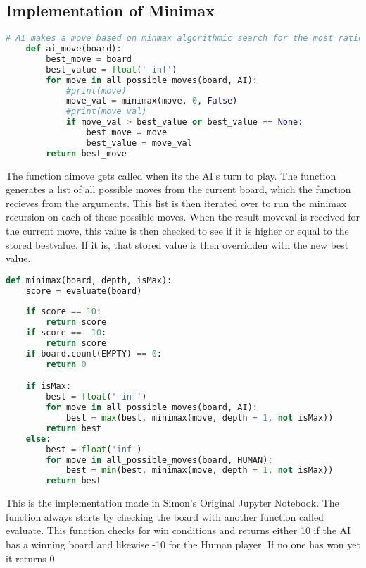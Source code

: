 \subsection{Implementation of Minimax}
\label{subsec:Implementation of Minimax}
\begin{lstlisting}[language=python, caption={python example}, label={Script}, basicstyle=\ttfamily\small]
    # AI makes a move based on minmax algorithmic search for the most rational move to make
    def ai_move(board):
        best_move = board
        best_value = float('-inf')
        for move in all_possible_moves(board, AI):
            #print(move)
            move_val = minimax(move, 0, False)
            #print(move_val)
            if move_val > best_value or best_value == None:
                best_move = move
                best_value = move_val
        return best_move
\end{lstlisting}

The function ai\textunderscore move gets called when its the AI's turn to play. The function generates a list of all possible moves from the current board, 
which the function recieves from the arguments.
This list is then iterated over to run the minimax recursion on each of these possible moves.
When the result move\textunderscore val is received for the current move, this value is then checked to see if it is higher or equal to the stored best\textunderscore value. 
If it is, that stored value is then overridden with the new best value.

\begin{lstlisting}[language=python, caption={python example}, label={Script}, basicstyle=\ttfamily\small]
    def minimax(board, depth, isMax):
    score = evaluate(board)
    
    if score == 10: 
        return score
    if score == -10:
        return score
    if board.count(EMPTY) == 0:
        return 0

    if isMax:
        best = float('-inf')
        for move in all_possible_moves(board, AI):
            best = max(best, minimax(move, depth + 1, not isMax))
        return best
    else:
        best = float('inf')
        for move in all_possible_moves(board, HUMAN):
            best = min(best, minimax(move, depth + 1, not isMax))
        return best
\end{lstlisting}

This is the implementation made in Simon's Original Jupyter Notebook. 
The function always starts by checking the board with another function called evaluate. 
This function checks for win conditions and returns either 10 if the AI has a winning board and likewise -10 for the Human player.
If no one has won yet it returns 0.


